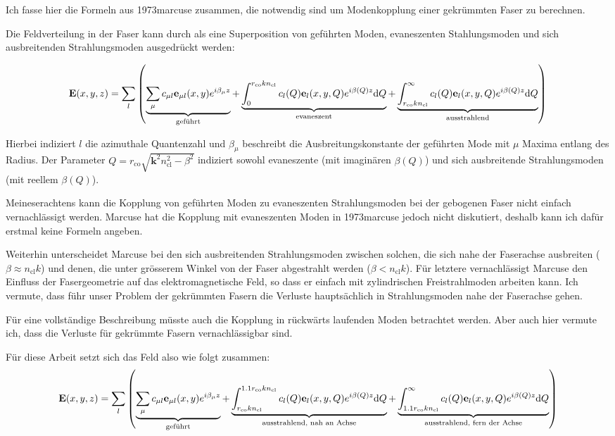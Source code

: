 \documentclass{article}
\newcommand{\vect}[1]{\mathbf{#1}}
\def\k{\vect k}
\def\drm{\textrm d}
\def\e{\vect e}
\def\E{\vect E}
\def\({\left(}
\def\){\right)}
\newcommand{\rco}{r_\textrm{co}}
\newcommand{\ncl}{n_\textrm{cl}}
\begin{document}
Ich fasse hier die Formeln aus 1973marcuse zusammen, die notwendig
sind um Modenkopplung einer gekr\"ummten Faser zu berechnen.

Die Feldverteilung in der Faser kann durch als eine Superposition von
gef\"uhrten Moden, evaneszenten Stahlungsmoden und sich ausbreitenden
Strahlungsmoden ausgedr\"uckt werden:

\begin{align}
\E(x,y,z) = \sum_l\(
\underbrace{\sum_\mu c_{\mu l} \e_{\mu l}(x,y) e^{i\beta_\mu z}}_\textnormal{gef\"uhrt} +
\underbrace{\int_0^{\rco k \ncl} c_l(Q) \e_l(x,y,Q) e^{i\beta(Q)z}\drm Q}_\textnormal{evaneszent} +
\underbrace{\int_{\rco k \ncl}^\infty c_l(Q) \e_l(x,y,Q) e^{i\beta(Q)z}\drm Q}_\textnormal{ausstrahlend}
\)
\end{align}

Hierbei indiziert $l$ die azimuthale Quantenzahl und $\beta_\mu$
beschreibt die Ausbreitungskonstante der gef\"uhrten Mode mit $\mu$
Maxima entlang des Radius. Der Parameter
$Q=\rco\sqrt{\k^2\ncl^2-\beta^2}$ indiziert sowohl evaneszente (mit
imagin\"aren $\beta(Q)$) und sich ausbreitende Strahlungsmoden (mit
reellem $\beta(Q)$).

Meineserachtens kann die Kopplung von gef\"uhrten Moden zu
evaneszenten Strahlungsmoden bei der gebogenen Faser nicht einfach
vernachl\"assigt werden. Marcuse hat die Kopplung mit evaneszenten
Moden in 1973marcuse jedoch nicht diskutiert, deshalb kann ich daf\"ur
erstmal keine Formeln angeben.

Weiterhin unterscheidet Marcuse bei den sich ausbreitenden
Strahlungsmoden zwischen solchen, die sich nahe der Faserachse
ausbreiten ($\beta\approx \ncl k$) und denen, die unter gr\"osserem
Winkel von der Faser abgestrahlt werden ($\beta<\ncl k$). F\"ur
letztere vernachl\"assigt Marcuse den Einfluss der Fasergeometrie auf
das elektromagnetische Feld, so dass er einfach mit zylindrischen
Freistrahlmoden arbeiten kann. Ich vermute, dass f\"uhr unser Problem
der gekr\"ummten Fasern die Verluste haupts\"achlich in
Strahlungsmoden nahe der Faserachse gehen.

F\"ur eine vollst\"andige Beschreibung m\"usste auch die Kopplung in
r\"uckw\"arts laufenden Moden betrachtet werden. Aber auch hier
vermute ich, dass die Verluste f\"ur gekr\"ummte Fasern
vernachl\"assigbar sind.

F\"ur diese Arbeit setzt sich das Feld also wie folgt zusammen:
\begin{align}
\E(x,y,z) = \sum_l\(
\underbrace{\sum_\mu c_{\mu l} \e_{\mu l}(x,y) e^{i\beta_\mu z}}_\textnormal{gef\"uhrt} +
\underbrace{\int_{\rco k \ncl}^{1.1 \rco k \ncl} c_l(Q) \e_l(x,y,Q) e^{i\beta(Q)z}\drm Q}_\textnormal{ausstrahlend, nah an Achse} +
\underbrace{\int_{1.1 \rco k \ncl}^\infty c_l(Q) \e_l(x,y,Q) e^{i\beta(Q)z}\drm Q}_\textnormal{ausstrahlend, fern der Achse}
\)
\end{align}
\end{document}
